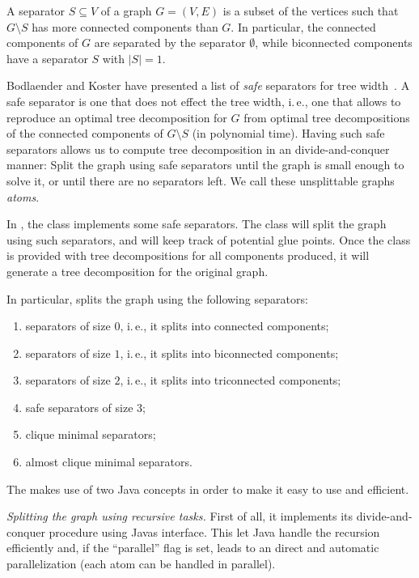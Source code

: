 \documentclass[a4paper, ukenglish, twoside, openright]{jdrasilmanual}
\begin{document}
A separator $S\subseteq V$ of a graph $G=(V,E)$ is a subset of the
vertices such that $G\setminus S$ has more connected components
than $G$. In particular, the connected components of $G$ are separated
by the separator $\emptyset$, while biconnected components have a
separator $S$ with $|S|=1$.

Bodlaender and Koster have presented a list of \emph{safe} separators
for tree width~\cite{BodlaenderK2006}. A safe separator is one that
does not effect the tree width, i.\,e., one that allows to reproduce
an optimal tree decomposition for $G$ from optimal tree decompositions
of the connected components of $G\setminus S$ (in polynomial
time). Having such safe separators allows us to compute tree
decomposition in an divide-and-conquer manner: Split the graph using
safe separators until the graph is small enough to solve it, or until
there are no separators left. We call these unsplittable graphs \emph{atoms}.

In \Jdrasil, the class  implements some safe
separators. The class will split the graph using such separators, and
will keep track of potential glue points. Once the class is provided
with tree decompositions for all components produced, it will generate
a tree decomposition for the original graph.

In particular,  splits the graph using the
following separators:
\begin{enumerate}
  \item separators of size $0$, i.\,e., it splits into connected
    components;
  \item separators of size $1$, i.\,e., it splits into biconnected
    components;
  \item separators of size $2$, i.\,e., it splits into triconnected
    components;
  \item safe separators of size $3$;
  \item clique minimal separators;
  \item almost clique minimal separators.
\end{enumerate}
The  makes use of two Java concepts in order to
make it easy to use and efficient.

\emph{Splitting the graph using recursive tasks.} First of all, it implements its
divide-and-conquer procedure using Javas 
interface. This let Java handle the recursion efficiently and, if the
``parallel'' flag is set, leads to an direct and automatic parallelization (each atom can
be handled in parallel).
\end{document}
